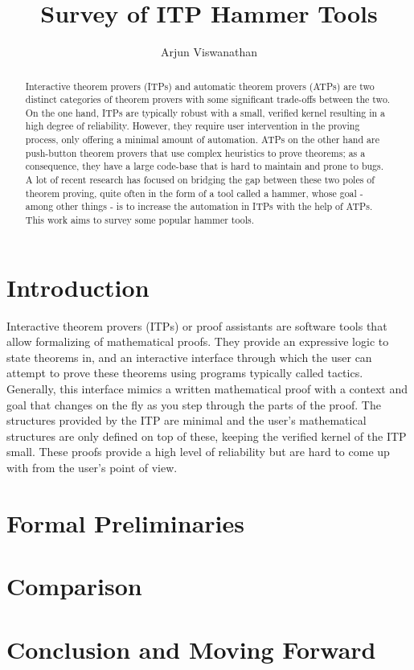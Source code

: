 \documentclass{article}
\begin{document}
\title{Survey of ITP Hammer Tools}
\author{Arjun Viswanathan}
\date{}
\maketitle
\begin{abstract}
	Interactive theorem provers (ITPs) and automatic theorem provers (ATPs)
	are two distinct categories of theorem provers with some significant 
	trade-offs between the two. On the one hand, ITPs are typically robust
	with a small, verified kernel resulting in a high degree of reliability.
	However, they require user intervention in the proving process, only 
	offering a minimal amount of automation. ATPs on the other hand are 
	push-button theorem provers that use complex heuristics to prove 
	theorems; as a consequence, they have a large code-base that is hard 
	to maintain and prone to bugs. A lot of recent research has focused on 
	bridging the gap between these two poles of theorem proving, quite often 
	in the form of a tool called a hammer, whose goal - among other 
	things - is to increase the automation in ITPs with the help of 
	ATPs. This work aims to survey some popular hammer tools.
\end{abstract}

\section{Introduction}
\label{sec:intro}
	Interactive theorem provers (ITPs) or proof assistants are 
	software tools that allow formalizing of mathematical proofs.
	They provide an expressive logic to state theorems in, and 
	an interactive interface through which the user can 
	attempt to prove these theorems using programs typically 
	called tactics. Generally, this interface mimics a 
	written mathematical proof with a context and goal 
	that changes on the fly as you step through the parts 
	of the proof. The structures provided by the ITP are 
	minimal and the user's mathematical structures are only 
	defined on top of these, keeping the verified kernel of the 
	ITP small. These proofs provide a high level of reliability
	but are hard to come up with from the user's point of view. 
	 



\section{Formal Preliminaries}
\label{sec:prelim}



\section{Comparison}
\label{sec:comp}



\section{Conclusion and Moving Forward}
\label{sec:conc}



\end{document}
